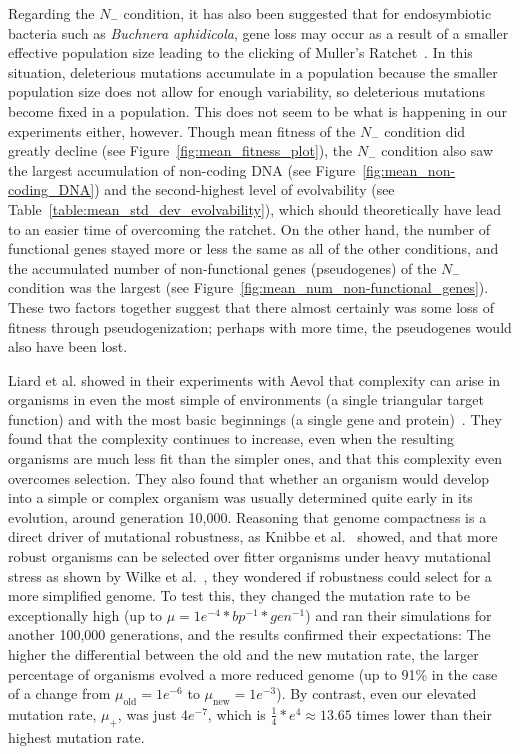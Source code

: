Regarding the $N_-$ condition, it has also been suggested that for endosymbiotic bacteria such as \textit{Buchnera aphidicola}, gene loss may occur as a result of a smaller effective population size leading to the clicking of Muller's Ratchet~\cite{Batut.2014}. In this situation, deleterious mutations accumulate in a population because the smaller population size does not allow for enough variability, so deleterious mutations become fixed in a population. This does not seem to be what is happening in our experiments either, however. Though mean fitness of the $N_-$ condition did greatly decline (see Figure~\ref{fig:mean_fitness_plot}), the $N_-$ condition also saw the largest accumulation of non-coding DNA (see Figure~\ref{fig:mean_non-coding_DNA}) and the second-highest level of evolvability (see Table~\ref{table:mean_std_dev_evolvability}), 
which should theoretically have lead to an easier time of overcoming the ratchet. On the other hand, the number of functional genes stayed more or less the same as all of the other conditions, and the accumulated number of non-functional genes (pseudogenes) of the $N_-$ condition was the largest (see Figure~\ref{fig:mean_num_non-functional_genes}). These two factors together suggest that there almost certainly was some loss of fitness through pseudogenization; perhaps with more time, the pseudogenes would also have been lost.

Liard et al. showed in their experiments with Aevol that complexity can arise in organisms in even the most simple of environments (a single triangular target function) and with the most basic beginnings (a single gene and protein)~\cite{Liard.2018}. They found that the complexity continues to increase, even when the resulting organisms are much less fit than the simpler ones, and that this complexity even overcomes selection. They also found that whether an organism would develop into a simple or complex organism was usually determined quite early in its evolution, around generation 10,000. Reasoning that genome compactness is a direct driver of mutational robustness, as Knibbe et al.~\cite{Knibbe2007} showed, and that more robust organisms can be selected over fitter organisms under heavy mutational stress as shown by Wilke et al.~\cite{wilke2001evolution}, they wondered if robustness could select for a more simplified genome. To test this, they changed the mutation rate to be exceptionally high (up to $\mu = 1e^{-4} *bp^{-1}*gen^{-1}$) and ran their simulations for another 100,000 generations, and the results confirmed their expectations: The higher the differential between the old and the new mutation rate, the larger percentage of organisms evolved a more reduced genome (up to 91\% in the case of a change from $\mu_\text{old}=1e^{-6}$ to $\mu_\text{new}=1e^{-3}$). By contrast, even our elevated mutation rate, $\mu_+$, was just $4e^{-7}$, which is $\frac{1}{4}*e^4 \approx 13.65$ times lower than their highest mutation rate. %

